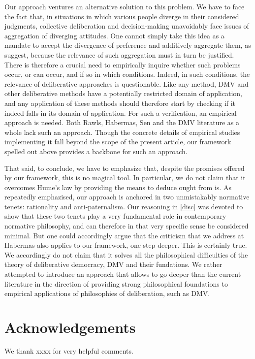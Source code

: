 \documentclass[version=3.21, pagesize, twoside=off, bibliography=totoc, DIV=calc, fontsize=12pt, a4paper, french, english]{scrartcl}
\newenvironment{acknowledgements}{
	\section*{Acknowledgements}
}{
}
\begin{document}
Our approach ventures an alternative solution to this problem. 
We have to face the fact that, in situations in which various people diverge in their considered judgments, collective deliberation and decision-making unavoidably face issues of aggregation of diverging attitudes. 
One cannot simply take this idea as a mandate to accept the divergence of preference and additively aggregate them, as \citeauthor{bartkowski_beyond_2018} suggest, because the relevance of such aggregation must in turn be justified. 
There is therefore a crucial need to empirically inquire whether such problems occur, or can occur, and if so in which conditions. Indeed, in such conditions, the relevance of deliberative approaches is questionable. 
Like any method, DMV and other deliberative methods have a potentially restricted domain of application, and any application of these methods should therefore start by checking if it indeed falls in its domain of application. 
For such a verification, an empirical approach is needed. 
Both Rawls, Habermas, Sen and the DMV literature as a whole lack such an approach. 
Though the concrete details of empirical studies implementing it fall beyond the scope of the present article, our framework spelled out above provides a backbone for such an approach.

That said, to conclude, we have to emphasize that, despite the promises offered by our framework, this is no magical tool. 
In particular, we do not claim that it overcomes Hume's law by providing the means to deduce ought from is. 
As repeatedly emphazised, our approach is anchored in two unmistakably normative tenets: rationality and anti-paternalism. 
Our reasoning in \cref{disc} was devoted to show that these two tenets play a very fundamental role in contemporary normative philosophy, and can therefore in that very specific sense be considered minimal. 
But one could accordingly argue that the criticism that we address at Habermas also applies to our framework, one step deeper. This is certainly true. 
We accordingly do not claim that it solves all the philosophical difficulties of the theory of deliberative democracy, DMV and their fundations. 
We rather attempted to introduce an approach that allows to go deeper than the current literature in the direction of providing strong philosophical foundations to empirical applications of philosophies of deliberation, such as DMV. 


\begin{acknowledgements}
We thank xxxx for very helpful comments.
\end{acknowledgements}



\end{document}
